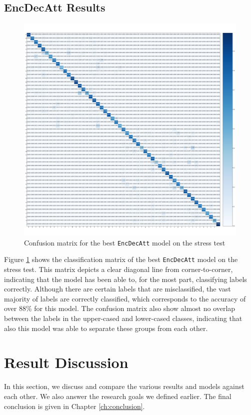 \subsection{EncDecAtt Results}
\begin{figure}[H]
    \centering
    \includegraphics[width=1\textwidth]{fig/results/experiment4/encdecatt/confusion_matrix.png}
    \caption{Confusion matrix for the best {\tt EncDecAtt} model on the stress test}
    \label{fig:result4_encdecatt_confusion_matrix}
\end{figure}

Figure \ref{fig:result4_encdecatt_confusion_matrix} shows the classification matrix of the best {\tt EncDecAtt} model on the stress test. This matrix depicts a clear diagonal line from corner-to-corner, indicating that the model has been able to, for the most part, classifying labels correctly. Although there are certain labels that are misclassified, the vast majority of labels are correctly classified, which corresponds to the accuracy of over 88\% for this model. The confusion matrix also show almost no overlap between the labels in the upper-cased and lower-cased classes, indicating that also this model was able to separate these groups from each other. 


\section{Result Discussion}
\label{sec:result_discussion}
In this section, we discuss and compare the various results and models against each other. We also answer the research goals we defined earlier. The final conclusion is given in Chapter \ref{ch:conclusion}.

